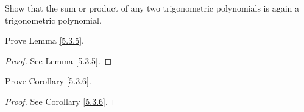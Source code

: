 \exercisesection

\begin{exercise}\label{ex 5.3.1}
    Show that the sum or product of any two trigonometric polynomials is again a trigonometric polynomial.
\end{exercise}

\begin{exercise}\label{ex 5.3.2}
    Prove Lemma \ref{5.3.5}.
\end{exercise}

\begin{proof}
    See Lemma \ref{5.3.5}.
\end{proof}

\begin{exercise}\label{ex 5.3.3}
    Prove Corollary \ref{5.3.6}.
\end{exercise}

\begin{proof}
    See Corollary \ref{5.3.6}.
\end{proof}